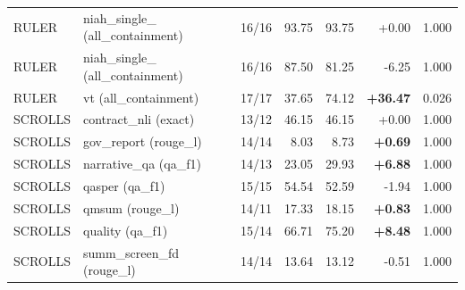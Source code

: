 \begin{longtable}{lp{3.1cm}rrrrr}
RULER & \raggedright niah\_\allowbreak single\_\allowbreak 2 {\tiny (all\_containment)} & 16/16 & 93.75 & 93.75 & +0.00 & 1.000 \\
RULER & \raggedright niah\_\allowbreak single\_\allowbreak 3 {\tiny (all\_containment)} & 16/16 & 87.50 & 81.25 & -6.25 & 1.000 \\
RULER & \raggedright vt {\tiny (all\_containment)} & 17/17 & 37.65 & 74.12 & \textbf{+36.47} & 0.026 \\
SCROLLS & \raggedright contract\_\allowbreak nli {\tiny (exact)} & 13/12 & 46.15 & 46.15 & +0.00 & 1.000 \\
SCROLLS & \raggedright gov\_\allowbreak report {\tiny (rouge\_l)} & 14/14 & 8.03 & 8.73 & \textbf{+0.69} & 1.000 \\
SCROLLS & \raggedright narrative\_\allowbreak qa {\tiny (qa\_f1)} & 14/13 & 23.05 & 29.93 & \textbf{+6.88} & 1.000 \\
SCROLLS & \raggedright qasper {\tiny (qa\_f1)} & 15/15 & 54.54 & 52.59 & -1.94 & 1.000 \\
SCROLLS & \raggedright qmsum {\tiny (rouge\_l)} & 14/11 & 17.33 & 18.15 & \textbf{+0.83} & 1.000 \\
SCROLLS & \raggedright quality {\tiny (qa\_f1)} & 15/14 & 66.71 & 75.20 & \textbf{+8.48} & 1.000 \\
SCROLLS & \raggedright summ\_\allowbreak screen\_\allowbreak fd {\tiny (rouge\_l)} & 14/14 & 13.64 & 13.12 & -0.51 & 1.000 \\
\end{longtable}
\endgroup
